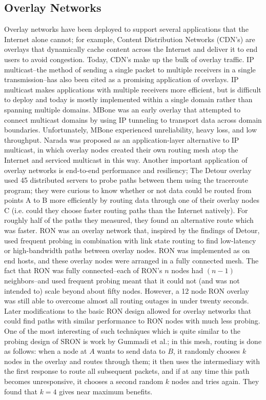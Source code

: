 \documentclass[pageno]{jpaper}
\begin{document}
\subsection{Overlay Networks}
Overlay networks have been deployed to support several applications that the Internet
alone cannot; for example, Content Distribution Networks (CDN's) are overlays that 
dynamically cache content across the Internet and deliver it to end users to avoid congestion.
Today, CDN's make up the bulk of overlay traffic\cite{kurian}.\bigskip
IP multicast--the method of sending a single packet to multiple receivers in a single transmission--has also been cited as a promising application of overlays.  IP multicast makes applications with multiple receivers more efficient, but is difficult to deploy and today is mostly implemented within a single domain rather than spanning multiple domains\cite{kurian}.  MBone\cite{Macedonia:1994:MPA:618987.620017} was an early overlay that attempted to connect multicast domains by using IP tunneling to transport data across domain boundaries.  Unfortunately, MBone experienced unreliability, heavy loss, and low throughput\cite{kurian}.  Narada\cite{Banerjee:2002:SAL:964725.633045} was proposed as an application-layer alternative to IP multicast, in which overlay nodes created their own routing mesh atop the Internet and serviced multicast in this way.\bigskip
Another important application of overlay networks is end-to-end performance and resiliency; The Detour\cite{Savage:1999:DII:623285.624244} overlay used 45 distributed servers to probe paths between them using the traceroute program; they were curious to know whether or not data could be routed from points A to B more efficiently by routing data through one of their overlay nodes C (i.e. could they choose faster routing paths than the Internet natively).  For roughly half of the paths they measured, they found an alternative route which was faster.  RON\cite{ron} was an overlay network that, inspired by the findings of Detour, used frequent probing in combination with link state routing to find low-latency or high-bandwidth paths between overlay nodes.  RON was implemented as on end hosts, and these overlay nodes were arranged in a fully connected mesh.  The fact that RON was fully connected--each of RON's $n$ nodes had $(n-1)$ neighbors--and used frequent probing meant that it could not (and was not intended to) scale beyond about fifty nodes.  However, a 12 node RON overlay was still able to overcome almost all routing outages in under twenty seconds.
Later modifications to the basic RON design allowed for overlay networks that could find paths with similar performance to RON nodes with much less probing.  One of the most interesting of such techniques which is quite similar to the probing design of SRON is work by Gummadi et al.\cite{Gummadi:2004:IRI:1251254.1251267}; in this mesh, routing is done as follows: when a node at $A$ wants to send data to $B$, it randomly chooses $k$ nodes in the overlay and routes through them; it then uses the intermediary with the first response to route all subsequent packets, and if at any time this path becomes unresponsive, it chooses a second random $k$ nodes and tries again.  They found that $k=4$ gives near maximum benefits. 
\end{document}
